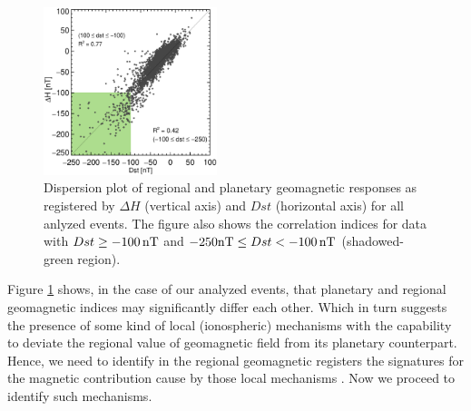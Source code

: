 \documentclass[a4paper,fleqn]{cas-dc}
\begin{document}
\begin{figure}
    \centering
     \includegraphics[width=0.45\textwidth]{images/disp_dst_v_dh/dispersion_general_dst.eps}
      \caption{Dispersion plot of regional and planetary geomagnetic responses as registered by $\Delta H$ (vertical axis) and $Dst$ (horizontal axis) for all anlyzed events. The figure also shows the correlation indices for data with $Dst \ge -100\, {\rm nT}$ and $-250 {\rm nT}\le Dst < -100\, {\rm nT}$ (shadowed-green region).}
       \label{fig:disp}
\end{figure}


Figure \ref{fig:disp} shows, in the case of our analyzed events, that planetary and regional geomagnetic indices may significantly differ each other. Which in turn suggests the presence of some kind of local (ionospheric) mechanisms with the capability to deviate the regional value of geomagnetic field from its planetary counterpart. Hence, we need to identify in the regional geomagnetic registers the signatures for the magnetic contribution cause by those local mechanisms \citep{ddyn2005, angeoddyn, amorymazaudier_2017, amory2020_filtros}. Now we proceed to identify such mechanisms.




\end{document}
